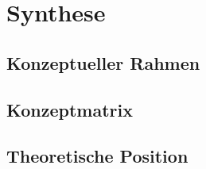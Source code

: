 \chapter{Synthese}\label{chap:synthese}



\section{Konzeptueller Rahmen}\label{sec:konzeptueller-rahmen}

\section{Konzeptmatrix}\label{sec:konzeptmatrix}
\tabKonzeptmatrix

\section{Theoretische Position}\label{sec:position}
